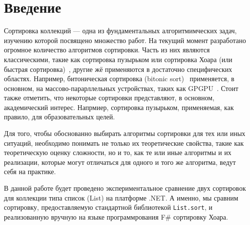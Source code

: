 \section{Введение}

Сортировка коллекций --- одна из фундаментальных алгоритмимческих задач, изучению которой посвящено множество работ.
На текущий момент разработано огромное количество алгоритмов сортировки.
Часть из них являются классическими, такие как сортировка пузырьком или сортировка Хоара (или быстрая сортировка)~\cite{hoare1962quicksort}, другие жё применяются в достаточно специфических областях. Например, битоническая сортировка (bitonic sort)~\cite{nassimi1979bitonic} применяется, в основном, на массово-парарллельных устройствах, таких как GPGPU~\cite{10.5555/1882792.1882841}.
Стоит также отметить, что некоторые сортировки представляют, в основном, академический интерес.
Напрмиер, сортировка пузырьком, применяемая, как правило, для образовательных целей.

Для того, чтобы обоснованно выбирать алгоритмы сортировки для тех или иных ситуаций, необходимо понимать не только их теоретические свойства, такие как теоретическую оценку сложности, но и то, как те или иные алгоритмы и их реализации, которые могут отличаться для одного и того же алгоритма, ведут себя на практике.

В данной работе будет проведено экспериментальное сравнение двух сортировок для коллекции типа список (List) на платформе .NET.
А именно, мы сравним сортировку, предоставляемую стандартной библиотекой \verb|List.sort|, и реализованную вручную на языке программрования F\# сортировку Хоара. 